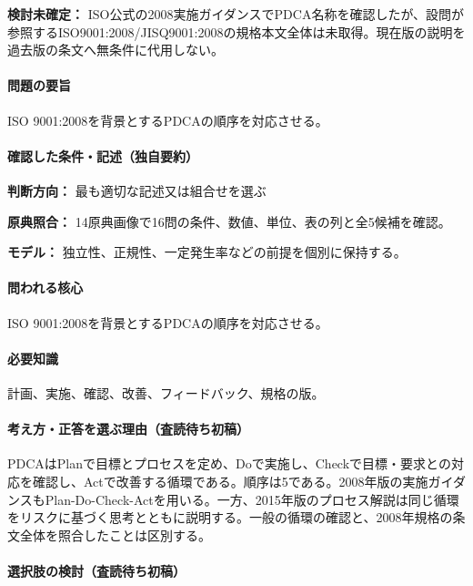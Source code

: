 \par\textbf{検討未確定：} ISO公式の2008実施ガイダンスでPDCA名称を確認したが、設問が参照するISO9001:2008/JISQ9001:2008の規格本文全体は未取得。現在版の説明を過去版の条文へ無条件に代用しない。

\paragraph{問題の要旨} ISO 9001:2008を背景とするPDCAの順序を対応させる。

\paragraph{確認した条件・記述（独自要約）}\mbox{}\par

\noindent\textbf{判断方向：} 最も適切な記述又は組合せを選ぶ\par

\noindent\textbf{原典照合：} 14原典画像で16問の条件、数値、単位、表の列と全5候補を確認。\par

\noindent\textbf{モデル：} 独立性、正規性、一定発生率などの前提を個別に保持する。\par

\paragraph{問われる核心} ISO 9001:2008を背景とするPDCAの順序を対応させる。

\paragraph{必要知識} 計画、実施、確認、改善、フィードバック、規格の版。

\paragraph{考え方・正答を選ぶ理由（査読待ち初稿）} PDCAはPlanで目標とプロセスを定め、Doで実施し、Checkで目標・要求との対応を確認し、Actで改善する循環である。順序は5である。2008年版の実施ガイダンスもPlan-Do-Check-Actを用いる。一方、2015年版のプロセス解説は同じ循環をリスクに基づく思考とともに説明する。一般の循環の確認と、2008年規格の条文全体を照合したことは区別する。

\paragraph{選択肢の検討（査読待ち初稿）}\mbox{}\par

